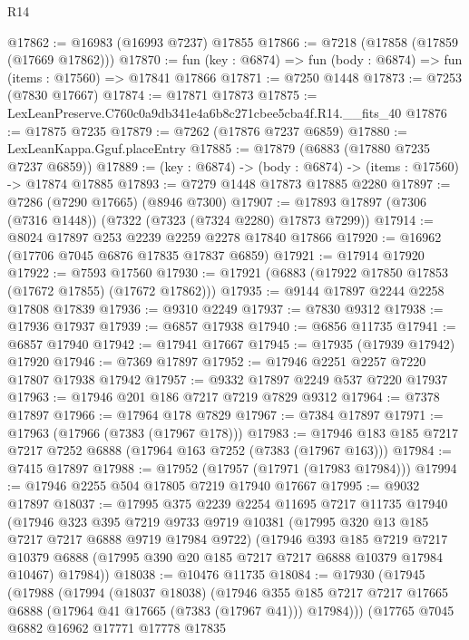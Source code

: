 \begin{lexlean}{R14}
\begin{coremodule}
@17862 := @16983 (@16993 @7237) @17855
@17866 := @7218 (@17858 (@17859 (@17669 @17862)))
@17870 := fun (key : @6874) => fun (body : @6874) => fun (items : @17560) => @17841 @17866
@17871 := @7250 @1448
@17873 := @7253 (@7830 @17667)
@17874 := @17871 @17873
@17875 := LexLeanPreserve.C760c0a9db341e4a6b8c271cbee5cba4f.R14.__fits_40
@17876 := @17875 @7235
@17879 := @7262 (@17876 @7237 @6859)
@17880 := LexLeanKappa.Gguf.placeEntry
@17885 := @17879 (@6883 (@17880 @7235 @7237 @6859))
@17889 := (key : @6874) -> (body : @6874) -> (items : @17560) -> @17874 @17885
@17893 := @7279 @1448 @17873 @17885 @2280
@17897 := @7286 (@7290 @17665) (@8946 @7300)
@17907 := @17893 @17897 (@7306 (@7316 @1448)) (@7322 (@7323 (@7324 @2280) @17873 @7299))
@17914 := @8024 @17897 @253 @2239 @2259 @2278 @17840 @17866
@17920 := @16962 (@17706 @7045 @6876 @17835 @17837 @6859)
@17921 := @17914 @17920
@17922 := @7593 @17560
@17930 := @17921 (@6883 (@17922 @17850 @17853 (@17672 @17855) (@17672 @17862)))
@17935 := @9144 @17897 @2244 @2258 @17808 @17839
@17936 := @9310 @2249
@17937 := @7830 @9312
@17938 := @17936 @17937
@17939 := @6857 @17938
@17940 := @6856 @11735
@17941 := @6857 @17940
@17942 := @17941 @17667
@17945 := @17935 (@17939 @17942) @17920
@17946 := @7369 @17897
@17952 := @17946 @2251 @2257 @7220 @17807 @17938 @17942
@17957 := @9332 @17897 @2249 @537 @7220 @17937
@17963 := @17946 @201 @186 @7217 @7219 @7829 @9312
@17964 := @7378 @17897
@17966 := @17964 @178 @7829
@17967 := @7384 @17897
@17971 := @17963 (@17966 (@7383 (@17967 @178)))
@17983 := @17946 @183 @185 @7217 @7217 @7252 @6888 (@17964 @163 @7252 (@7383 (@17967 @163)))
@17984 := @7415 @17897
@17988 := @17952 (@17957 (@17971 (@17983 @17984)))
@17994 := @17946 @2255 @504 @17805 @7219 @17940 @17667
@17995 := @9032 @17897
@18037 := @17995
    @375
    @2239
    @2254
    @11695
    @7217
    @11735
    @17940
    (@17946
      @323
      @395
      @7219
      @9733
      @9719
      @10381
      (@17995 @320 @13 @185 @7217 @7217 @6888 @9719 @17984 @9722)
      (@17946
        @393
        @185
        @7219
        @7217
        @10379
        @6888
        (@17995 @390 @20 @185 @7217 @7217 @6888 @10379 @17984 @10467)
        @17984))
@18038 := @10476 @11735
@18084 := @17930
    (@17945
      (@17988
        (@17994
          (@18037 @18038)
          (@17946
            @355
            @185
            @7217
            @7217
            @17665
            @6888
            (@17964 @41 @17665 (@7383 (@17967 @41)))
            @17984)))
      (@17765
        @7045
        @6882
        @16962
        @17771
        @17778
        @17835

\end{coremodule}
\end{lexlean}
